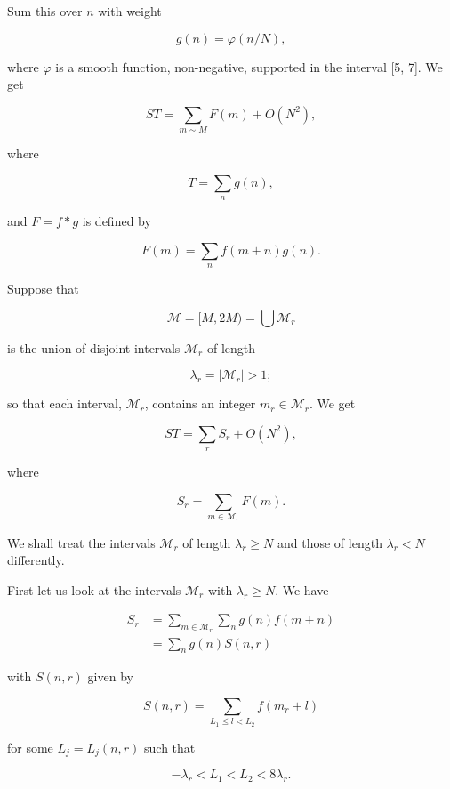 \documentclass[10pt]{article}
\begin{document}
Sum this over $n$ with weight

$$
g(n)=\varphi(n / N),
$$

where $\varphi$ is a smooth function, non-negative, supported in the interval [5, 7]. We get

$$
S T=\sum_{m \sim M} F(m)+O\left(N^{2}\right),
$$

where

$$
T=\sum_{n} g(n),
$$

and $F=f * g$ is defined by

$$
F(m)=\sum_{n} f(m+n) g(n) .
$$

Suppose that

$$
\mathscr{M}=[M, 2 M)=\bigcup \mathscr{M}_{r}
$$

is the union of disjoint intervals $\mathscr{M}_{r}$ of length

$$
\lambda_{r}=\left|\mathscr{M}_{r}\right|>1 ;
$$

so that each interval, $\mathscr{M}_{r}$, contains an integer $m_{r} \in \mathscr{M}_{r}$. We get


\begin{equation*}
S T=\sum_{r} S_{r}+O\left(N^{2}\right), \tag{5.1}
\end{equation*}


where


\begin{equation*}
S_{r}=\sum_{m \in \mathscr{M}_{r}} F(m) . \tag{5.2}
\end{equation*}


We shall treat the intervals $\mathscr{M}_{r}$ of length $\lambda_{r} \geqslant N$ and those of length $\lambda_{r}<N$ differently.

First let us look at the intervals $\mathscr{M}_{r}$ with $\lambda_{r} \geqslant N$. We have


\begin{align*}
S_{r} & =\sum_{m \in \mathscr{M}_{r}} \sum_{n} g(n) f(m+n)  \tag{5.3}\\
& =\sum_{n} g(n) S(n, r)
\end{align*}


with $S(n, r)$ given by


\begin{equation*}
S(n, r)=\sum_{L_{1} \leqslant l<L_{2}} f\left(m_{r}+l\right) \tag{5.4}
\end{equation*}


for some $L_{j}=L_{j}(n, r)$ such that


\begin{equation*}
-\lambda_{r}<L_{1}<L_{2}<8 \lambda_{r} . \tag{5.5}
\end{equation*}
\end{document}
